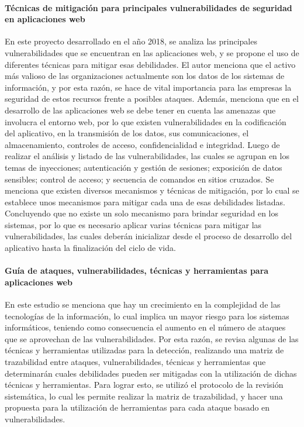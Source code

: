 \paragraph{Técnicas de mitigación para principales vulnerabilidades de seguridad en aplicaciones web \cite{AlexZambrano}}
En este proyecto desarrollado en el año 2018, se analiza las principales vulnerabilidades que se encuentran en las aplicaciones web, y se propone el uso de diferentes técnicas para mitigar esas debilidades. El autor menciona que el activo más valioso de las organizaciones actualmente son los datos de los sistemas de información, y por esta razón, se hace de vital importancia para las empresas la seguridad de estos recursos frente a posibles ataques. Además, menciona que en el desarrollo de las aplicaciones web se debe tener en cuenta las amenazas que involucra el entorno web, por lo que existen vulnerabilidades en la codificación del aplicativo, en la transmisión de los datos, sus comunicaciones, el almacenamiento, controles de acceso, confidencialidad e integridad.
Luego de realizar el análisis y listado de las vulnerabilidades, las cuales se agrupan en los temas de inyecciones; autenticación y gestión de sesiones; exposición de datos sensibles; control de acceso; y secuencia de comandos en sitios cruzados. Se menciona que existen diversos mecanismos y técnicas de mitigación, por lo cual se establece unos mecanismos para mitigar cada una de esas debilidades listadas. Concluyendo que no existe un solo mecanismo para brindar seguridad en los sistemas, por lo que es necesario aplicar varias técnicas para mitigar las vulnerabilidades, las cuales deberán inicializar desde el proceso de desarrollo del aplicativo hasta la finalización del ciclo de vida.

\paragraph{Guía de ataques, vulnerabilidades, técnicas y herramientas para aplicaciones web \cite{AnaSaucedo}}
En este estudio se menciona que hay un crecimiento en la complejidad de las tecnologías de la información, lo cual implica un mayor riesgo para los sistemas informáticos, teniendo como consecuencia el aumento en el número de ataques que se aprovechan de las vulnerabilidades. Por esta razón, se revisa algunas de las técnicas y herramientas utilizadas para la detección, realizando una matriz de trazabilidad entre ataques, vulnerabilidades, técnicas y herramientas que determinarán cuales debilidades pueden ser mitigadas con la utilización de dichas técnicas y herramientas. Para lograr esto, se utilizó el protocolo de la revisión sistemática, lo cual les permite realizar la matriz de trazabilidad, y hacer una propuesta para la utilización de herramientas para cada ataque basado en vulnerabilidades.

